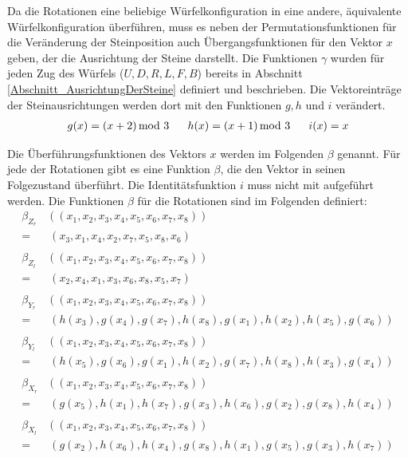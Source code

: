 \documentclass[12pt,a4paper, usenames, dvipsnames]{article}
\theoremstyle{mystyle}
\theoremstyle{definition}
\begin{document}
Da die Rotationen eine beliebige Würfel\-konfiguration in eine andere, äquivalente Würfel\-konfiguration überführen, muss es neben der Permutationsfunktionen für die Veränderung der Steinposition auch Übergangsfunktionen für den Vektor $x$ geben, der die Ausrichtung der Steine darstellt. Die Funktionen $\gamma$ wurden für jeden Zug des Würfels ($U, D, R, L, F, B$) bereits in Abschnitt \ref{Abschnitt_AusrichtungDerSteine} definiert und beschrieben. Die Vektoreinträge der Steinausrichtungen werden dort mit den Funktionen $g, h$ und $i$ verändert.
\begin{align*}
g(x)=(x + 2) \hspace*{-0.5em} \mod 3 \ \ \ \ \ h(x) = (x+1) \hspace*{-0.5em} \mod 3 \ \ \ \ \ i(x)=x
\end{align*}

Die Überführungsfunktionen des Vektors $x$ werden im Folgenden $\beta$ genannt. Für jede der Rotationen gibt es eine Funktion $\beta$, die den Vektor in seinen Folgezustand überführt. Die Identitätsfunktion $i$ muss nicht mit aufgeführt werden. Die Funktionen $\beta$ für die Rotationen sind im Folgenden definiert:
\begin{align*}
\beta_{Z_r}  & \left( (x_1, x_2, x_3, x_4, x_5,x_6,x_7,x_8) \right)  \\
=  & \ (x_3, x_1, x_4, x_2, x_7, x_5, x_8, x_6) \\
\\
\beta_{Z_l}  &   \left( (x_1, x_2, x_3, x_4, x_5,x_6,x_7,x_8) \right)  \\
=  &  \ (x_2, x_4, x_1, x_3, x_6, x_8, x_5, x_7) \\
\\
\beta_{Y_r}  &  \left( (x_1, x_2, x_3, x_4, x_5,x_6,x_7,x_8)  \right) \\
=  & \ (h(x_3), g(x_4), g(x_7), h(x_8), g(x_1), h(x_2), h(x_5), g(x_6)) \\
\\
\beta_{Y_l}  &   \left( (x_1, x_2, x_3, x_4, x_5,x_6,x_7,x_8) \right)  \\
=  & \ (h(x_5), g(x_6), g(x_1), h(x_2),g(x_7),h(x_8),h(x_3),g(x_4)) \\
\\
\beta_{X_r}  &  \left( (x_1, x_2, x_3, x_4, x_5,x_6,x_7,x_8)  \right) \\
=  & \ (g(x_5), h(x_1), h(x_7), g(x_3), h(x_6), g(x_2), g(x_8),h(x_4)) \\
\\
\beta_{X_l}  &  \left( (x_1, x_2, x_3, x_4, x_5,x_6,x_7,x_8) \right)  \\
=  & \ (g(x_2), h(x_6), h(x_4),g(x_8), h(x_1), g(x_5), g(x_3), h(x_7)) 
\end{align*}
\end{document}
